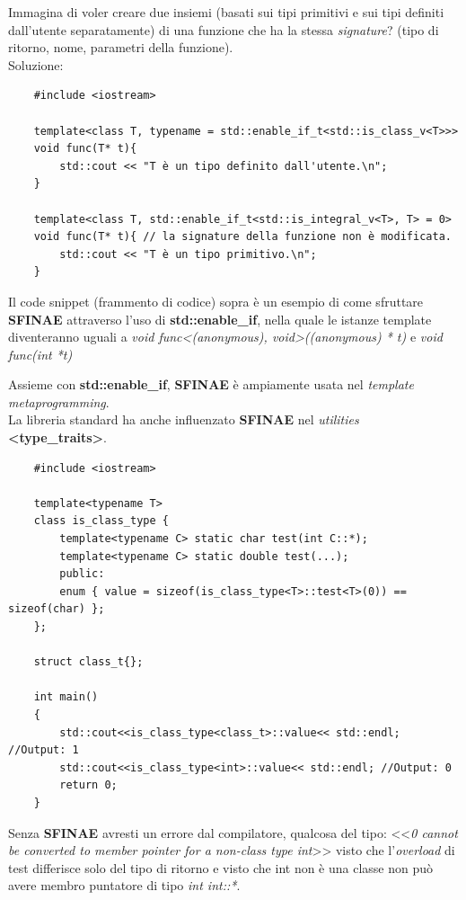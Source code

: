 \textsf{\small Immagina di voler creare due insiemi (basati sui tipi primitivi e sui tipi definiti dall'utente separatamente) di una funzione che ha la stessa \emph{signature}? (tipo di ritorno, nome, parametri della funzione).} \\

\textsf{\small Soluzione: } \\

\begin{lstlisting}
	#include <iostream>
	
	template<class T, typename = std::enable_if_t<std::is_class_v<T>>>
	void func(T* t){
		std::cout << "T è un tipo definito dall'utente.\n";
	}
	
	template<class T, std::enable_if_t<std::is_integral_v<T>, T> = 0>
	void func(T* t){ // la signature della funzione non è modificata.
		std::cout << "T è un tipo primitivo.\n";
	}
\end{lstlisting}

\textsf{\small Il code snippet (frammento di codice) sopra è un esempio di come sfruttare \textbf{SFINAE} attraverso l'uso di \textbf{std::enable\_if}, nella quale le istanze template diventeranno uguali a \emph{void func<(anonymous), void>((anonymous) * t)} e \emph{void func(int *t)}} \break

\textsf{\small Assieme con \textbf{std::enable\_if}, \textbf{SFINAE} è ampiamente usata nel \emph{template metaprogramming}.} \\

\textsf{\small La libreria standard ha anche influenzato \textbf{SFINAE} nel \emph{utilities} \textbf{<type\_traits>}.} \\

\begin{lstlisting}
	#include <iostream>
	
	template<typename T>
	class is_class_type {
		template<typename C> static char test(int C::*);    
		template<typename C> static double test(...);
		public:
		enum { value = sizeof(is_class_type<T>::test<T>(0)) == sizeof(char) };
	};
	
	struct class_t{};
	
	int main()
	{
		std::cout<<is_class_type<class_t>::value<< std::endl; //Output: 1
		std::cout<<is_class_type<int>::value<< std::endl; //Output: 0
		return 0;
	}
\end{lstlisting}

\textsf{\small Senza \textbf{SFINAE} avresti un errore dal compilatore, qualcosa del tipo: <<\emph{0 cannot be converted to member pointer for a non-class type int}>> visto che l'\emph{overload} di test differisce solo del tipo di ritorno e visto che int non è una classe non può avere membro puntatore di tipo \emph{int int::*}.} \\

